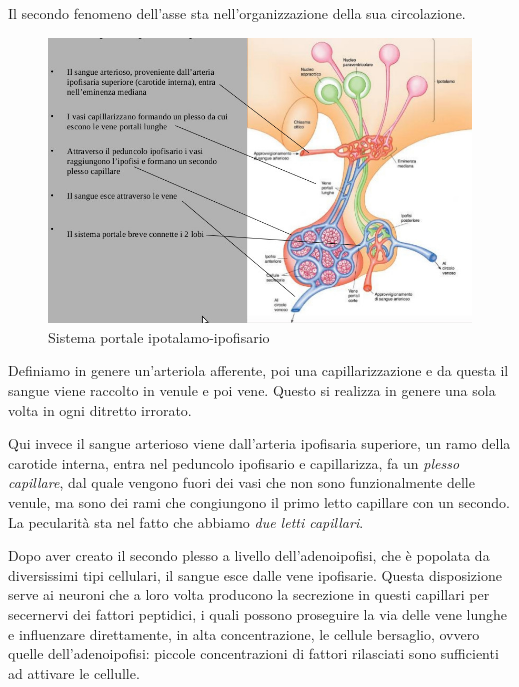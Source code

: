 \documentclass[a4paper,12pt]{article}
\begin{document}
Il secondo fenomeno dell'asse sta nell'organizzazione della sua circolazione. 
\begin{figure}[H]
\centering
\includegraphics[scale=0.4]{immagine/portale.jpg}
\caption{Sistema portale ipotalamo-ipofisario}
\end{figure}
Definiamo in genere un'arteriola afferente, poi una capillarizzazione e da questa il sangue viene raccolto in venule e poi vene. Questo si realizza in genere una sola volta in ogni ditretto irrorato.

Qui invece il sangue arterioso viene dall'arteria ipofisaria superiore, un ramo della carotide interna, entra nel peduncolo ipofisario e capillarizza, fa un \emph{plesso capillare}, dal quale vengono fuori dei vasi che non sono funzionalmente delle venule, ma sono dei rami che congiungono il primo letto capillare con un secondo. La pecularità sta nel fatto che abbiamo \emph{due letti capillari}.

Dopo aver creato il secondo plesso a livello dell'adenoipofisi, che è popolata da diversissimi tipi cellulari, il sangue esce dalle vene ipofisarie. Questa disposizione serve ai neuroni che a loro volta producono la secrezione in questi capillari per secernervi dei fattori peptidici, i quali possono proseguire la via delle vene lunghe e influenzare direttamente, in alta concentrazione, le cellule bersaglio, ovvero quelle dell'adenoipofisi: piccole concentrazioni di fattori rilasciati sono sufficienti ad attivare le cellulle.
\end{document}
